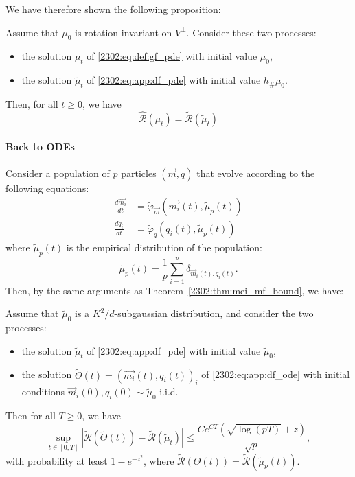 We have therefore shown the following proposition:
\begin{proposition}
    Assume that $\mu_0$ is rotation-invariant on $V^\bot$. Consider these two processes:
    \begin{itemize}
        \item the solution $\mu_t$ of \eqref{2302:eq:def:gf_pde} with initial value $\mu_0$,
        \item the solution $\tilde\mu_t$ of \eqref{2302:eq:app:df_pde} with initial value $h_{\#}\mu_0$. 
    \end{itemize}
    Then, for all $t \geq 0$, we have
    \begin{equation}
        \hat{\mathcal{R}}(\mu_t) = \tilde{\mathcal{R}}(\tilde\mu_t)
    \end{equation}
\end{proposition}

\paragraph{Back to ODEs} Consider a population of $p$ particles $(\vec{m}, q)$ that evolve according to the following equations:
\begin{equation}
    \label{2302:eq:app:df_ode}\tag{DF-ODE}
    \begin{split}
        \frac{d\vec{m_i}}{dt} &= \tilde \varphi_{\vec{m}}(\vec{m_i}(t), \tilde\mu_{p}(t)) \\
        \frac{dq_i}{dt}& = \tilde \varphi_{q}(q_i(t), \tilde\mu_{p}(t))
    \end{split}
\end{equation}
where $\tilde\mu_p(t)$ is the empirical distribution of the population:
\[ \tilde \mu_p(t) = \frac1p \sum_{i=1}^p \delta_{\vec{m}_i(t), q_i(t)}. \]
Then, by the same arguments as Theorem~\ref{2302:thm:mei_mf_bound}, we have:
\begin{proposition}\label{2302:prop:mf_approx_reduced}
    Assume that $\tilde\mu_0$ is a $K^2/d$-subgaussian distribution, and consider the two processes:
    \begin{itemize}
        \item the solution $\tilde\mu_t$ of \eqref{2302:eq:app:df_pde} with initial value $\tilde\mu_0$,
        \item the solution $\tilde\Theta(t) = (\vec{m_i}(t), q_i(t))_i$ of \eqref{2302:eq:app:df_ode} with initial conditions $\vec{m}_i(0), q_i(0) \sim \tilde \mu_0$ i.i.d.
    \end{itemize}
    Then for all $T \geq 0$, we have
    \begin{equation}
        \sup_{t \in [0, T]} \left|\tilde{\mathcal{R}}(\tilde\Theta(t)) - \tilde{\mathcal{R}}(\tilde\mu_t) \right| \leq \frac{Ce^{CT} \left(\sqrt{\log(pT)} + z \right)}{\sqrt{p}},
    \end{equation}
    with probability at least $1 - e^{-z^2}$, where $\tilde{\mathcal{R}}(\Theta(t)) = \tilde{\mathcal{R}}(\tilde\mu_p(t))$.
\end{proposition}

